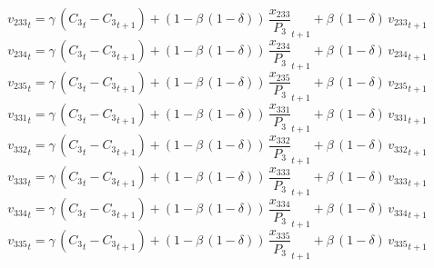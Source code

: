 \begin{dmath}
{{v_{233}}}_{t}={{\gamma}}\, \left({{C_{3}}}_{t}-{{C_{3}}}_{t+1}\right)+\left(1-{{\beta}}\, \left(1-{{\delta}}\right)\right)\, {{\frac{x_{233}}{P_{3}}}}_{t+1}+{{\beta}}\, \left(1-{{\delta}}\right)\, {{v_{233}}}_{t+1}
\end{dmath}
\begin{dmath}
{{v_{234}}}_{t}={{\gamma}}\, \left({{C_{3}}}_{t}-{{C_{3}}}_{t+1}\right)+\left(1-{{\beta}}\, \left(1-{{\delta}}\right)\right)\, {{\frac{x_{234}}{P_{3}}}}_{t+1}+{{\beta}}\, \left(1-{{\delta}}\right)\, {{v_{234}}}_{t+1}
\end{dmath}
\begin{dmath}
{{v_{235}}}_{t}={{\gamma}}\, \left({{C_{3}}}_{t}-{{C_{3}}}_{t+1}\right)+\left(1-{{\beta}}\, \left(1-{{\delta}}\right)\right)\, {{\frac{x_{235}}{P_{3}}}}_{t+1}+{{\beta}}\, \left(1-{{\delta}}\right)\, {{v_{235}}}_{t+1}
\end{dmath}
\begin{dmath}
{{v_{331}}}_{t}={{\gamma}}\, \left({{C_{3}}}_{t}-{{C_{3}}}_{t+1}\right)+\left(1-{{\beta}}\, \left(1-{{\delta}}\right)\right)\, {{\frac{x_{331}}{P_{3}}}}_{t+1}+{{\beta}}\, \left(1-{{\delta}}\right)\, {{v_{331}}}_{t+1}
\end{dmath}
\begin{dmath}
{{v_{332}}}_{t}={{\gamma}}\, \left({{C_{3}}}_{t}-{{C_{3}}}_{t+1}\right)+\left(1-{{\beta}}\, \left(1-{{\delta}}\right)\right)\, {{\frac{x_{332}}{P_{3}}}}_{t+1}+{{\beta}}\, \left(1-{{\delta}}\right)\, {{v_{332}}}_{t+1}
\end{dmath}
\begin{dmath}
{{v_{333}}}_{t}={{\gamma}}\, \left({{C_{3}}}_{t}-{{C_{3}}}_{t+1}\right)+\left(1-{{\beta}}\, \left(1-{{\delta}}\right)\right)\, {{\frac{x_{333}}{P_{3}}}}_{t+1}+{{\beta}}\, \left(1-{{\delta}}\right)\, {{v_{333}}}_{t+1}
\end{dmath}
\begin{dmath}
{{v_{334}}}_{t}={{\gamma}}\, \left({{C_{3}}}_{t}-{{C_{3}}}_{t+1}\right)+\left(1-{{\beta}}\, \left(1-{{\delta}}\right)\right)\, {{\frac{x_{334}}{P_{3}}}}_{t+1}+{{\beta}}\, \left(1-{{\delta}}\right)\, {{v_{334}}}_{t+1}
\end{dmath}
\begin{dmath}
{{v_{335}}}_{t}={{\gamma}}\, \left({{C_{3}}}_{t}-{{C_{3}}}_{t+1}\right)+\left(1-{{\beta}}\, \left(1-{{\delta}}\right)\right)\, {{\frac{x_{335}}{P_{3}}}}_{t+1}+{{\beta}}\, \left(1-{{\delta}}\right)\, {{v_{335}}}_{t+1}
\end{dmath}
